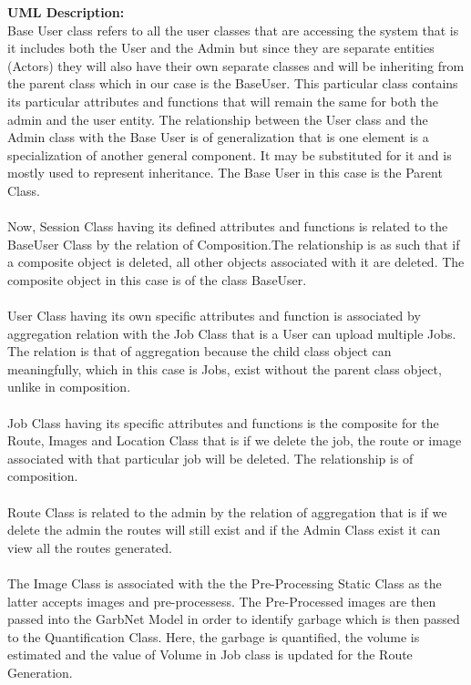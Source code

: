 \textbf{UML Description:}\\
Base User class refers to all the user classes that are accessing the system that is it includes both the User and the Admin but since they are separate entities (Actors) they will also have their own separate classes and will be inheriting from the parent class which in our case is the BaseUser. This particular class contains its particular attributes and functions that will remain the same for both the admin and the user entity. The relationship between the User class and the Admin class with the Base User is of generalization that is one element is a specialization of another general component. It may be substituted for it and is mostly used to represent inheritance. The Base User in this case is the Parent Class.\\
\\Now, Session Class having its defined attributes and functions is related to the BaseUser Class by the relation of Composition.The relationship is as such that if a composite object is deleted, all other objects associated with it are deleted. The composite object in this case is of the class BaseUser.\\
\\User Class having its own specific attributes and function is associated by aggregation relation with the Job Class that is a User can upload multiple Jobs. The relation is that of aggregation because the child class object can meaningfully, which in this case is Jobs, exist without the parent class object, unlike in composition.\\
\\Job Class having its specific attributes and functions is the composite for the Route, Images and Location Class that is if we delete the job, the route or image associated with that particular job will be deleted. The relationship is of composition.\\
\\Route Class is related to the admin by the relation of aggregation that is if we delete the admin the routes will still exist and if the Admin Class exist it can view all the routes generated.\\
\\The Image Class is associated with the the Pre-Processing Static Class as the latter accepts images and pre-processess. The Pre-Processed images are then passed into the GarbNet Model in order to identify garbage which is then passed to the Quantification Class. Here, the garbage is quantified, the volume is estimated and the value of Volume in Job class is updated for the Route Generation.



